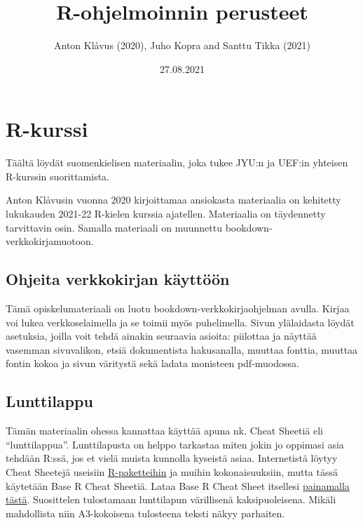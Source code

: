 \documentclass[
]{book}
\title{R-ohjelmoinnin perusteet}
\author{Anton Klåvus (2020), Juho Kopra and Santtu Tikka (2021)}
\date{27.08.2021}
\begin{document}
\maketitle

{
\setcounter{tocdepth}{1}
\tableofcontents
}
\hypertarget{r-kurssi}{%
\chapter*{R-kurssi}\label{r-kurssi}}

Täältä löydät suomenkielisen materiaalin, joka tukee JYU:n ja UEF:in yhteisen R-kurssin suorittamista.

Anton Klåvusin vuonna 2020 kirjoittamaa ansiokasta materiaalia on kehitetty lukukauden 2021-22 R-kielen kurssia ajatellen. Materiaalia on täydennetty tarvittavin osin. Samalla materiaali on muunnettu bookdown-verkkokirjamuotoon.

\hypertarget{ohjeita-verkkokirjan-kuxe4yttuxf6uxf6n}{%
\section*{Ohjeita verkkokirjan käyttöön}\label{ohjeita-verkkokirjan-kuxe4yttuxf6uxf6n}}

Tämä opiskelumateriaali on luotu bookdown-verkkokirjaohjelman avulla. Kirjaa voi lukea verkkoselaimella ja se toimii myös puhelimella. Sivun ylälaidasta löydät asetuksia, joilla voit tehdä ainakin seuraavia asioita: piilottaa ja näyttää vasemman sivuvalikon, etsiä dokumentista hakusanalla, muuttaa fonttia, muuttaa fontin kokoa ja sivun väritystä sekä ladata monisteen pdf-muodossa.

\hypertarget{lunttilappu}{%
\section*{Lunttilappu}\label{lunttilappu}}

Tämän materiaalin ohessa kannattaa käyttää apuna nk. Cheat Sheetiä eli ``lunttilappua''. Lunttilapusta on helppo tarkastaa miten jokin jo oppimasi asia tehdään R:ssä, jos et vielä muista kunnolla kyseistä asiaa. Internetistä löytyy Cheat Sheetejä useisiin \href{https://www.rstudio.com/resources/cheatsheets/}{R-paketteihin} ja muihin kokonaisuuksiin, mutta tässä käytetään Base R Cheat Sheetiä. Lataa Base R Cheat Sheet itsellesi \href{files/base_R_cheat_sheet.pdf}{painamalla tästä}. Suosittelen tulostamaan lunttilapun värillisenä kaksipuoleisena. Mikäli mahdollista niin A3-kokoisena tulosteena teksti näkyy parhaiten.
\end{document}
